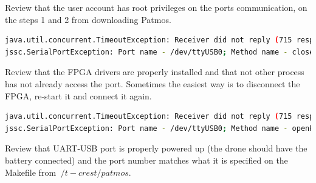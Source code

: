 \begin{itemize}
Review that the user account has root privileges on the ports communication, on the steps 1 and 2 from downloading Patmos.
    
\lstset{style=Bstyle}
\begin{lstlisting}[language=bash]
java.util.concurrent.TimeoutException: Receiver did not reply (715 responses missing)
jssc.SerialPortException: Port name - /dev/ttyUSB0; Method name - closePort(); Exception type - Port not opened.
\end{lstlisting} 

Review that the FPGA drivers are properly installed and that not other process has not already access the port. Sometimes the easiest way is to disconnect the FPGA, re-start it and connect it again.

\lstset{style=Bstyle}
\begin{lstlisting}[language=bash]
java.util.concurrent.TimeoutException: Receiver did not reply (715 responses missing)
jssc.SerialPortException: Port name - /dev/ttyUSB0; Method name - openPort(); Exception type - Port not found.
\end{lstlisting} 

Review that UART-USB port is properly powered up (the drone should have the battery connected) and the port number matches what it is specified on the Makefile from $~/t-crest/patmos$.
    
\end{itemize}
